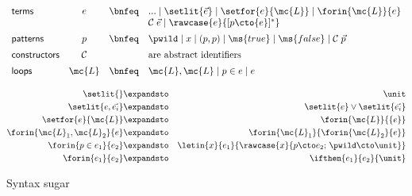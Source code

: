 \begin{figure}
  \[\begin{array}{lccl}
  \textsf{terms} &
  e &\bnfeq& ... \pipe \setlit{\vec{e}}
             \pipe \setfor{e}{\mc{L}}
             \pipe \forin{\mc{L}}{e}\\
  &&& \mathcal{C}\;\vec{e} \pipe \rawcase{e}{[{p} \cto {e}]^*}
  \vspace{0.5em}\\
  \textsf{patterns} &
  p &\bnfeq& \pwild \pipe x \pipe (p,p)
             \pipe \ms{true} \pipe \ms{false} \pipe \mathcal{C}\;\vec{p}
  \vspace{0.5em}\\
  \textsf{constructors} & \mathcal{C} && \text{are abstract identifiers}
  \vspace{0.5em}\\
  \textsf{loops} &
  \mc{L} &\bnfeq& \mc{L}, \mc{L} \pipe p \in e \pipe e
  \end{array}\]

  \begin{eqnarray*}
    \setlit{} &\expandsto& \unit\\
    \setlit{e,\vec{e_i}} &\expandsto& \setlit{e} \vee \setlit{\vec{e_i}}\\
    \setfor{e}{\mc{L}}       &\expandsto& \forin{\mc{L}}{\{e\}}\\
    \forin{\mc{L}_1,\mc{L}_2}{e}
    &\expandsto& \forin{\mc{L}_1}{\forin{\mc{L}_2}{e}}\\
    \forin{p\in e_1}{e_2} &\expandsto&
    \letin{x}{e_1}{\rawcase{x}{p \cto e_2;\,\pwild \cto \unit}}\\
    \forin{e_1}{e_2} &\expandsto& \ifthen{e_1}{e_2}{\unit}
  \end{eqnarray*}
  \caption{Syntax sugar}
  \label{fig:sugar}
\end{figure}


